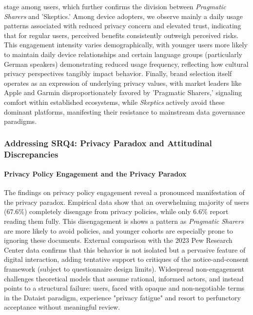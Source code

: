 stage among users, which further confirms the division between \textit{Pragmatic Sharers} and 'Skeptics.' Among device adopters, we observe mainly a daily usage patterns associated with reduced privacy concern and elevated trust, indicating that for regular users, perceived benefits consistently outweigh perceived risks. This engagement intensity varies demographically, with younger users more likely to maintain daily device relationships and certain language groups (particularly German speakers) demonstrating reduced usage frequency, reflecting how cultural privacy perspectives tangibly impact behavior. Finally, brand selection itself operates as an expression of underlying privacy values, with market leaders like Apple and Garmin disproportionately favored by 'Pragmatic Sharers,' signaling comfort within established ecosystems, while \textit{Skeptics} actively avoid these dominant platforms, manifesting their resistance to mainstream data governance paradigms.
	\subsubsection{Addressing SRQ4: Privacy Paradox and Attitudinal Discrepancies}

	\paragraph{Privacy Policy Engagement and the Privacy Paradox}
	The findings on privacy policy engagement reveal a pronounced manifestation of the privacy paradox. Empirical data show that an overwhelming majority of users (67.6\%) completely disengage from privacy policies, while only 6.6\% report reading them fully. This disengagement is shows a pattern as \textit{Pragmatic Sharers} are more likely to avoid policies, and younger cohorts are especially prone to ignoring these documents.
	External comparison with the 2023 Pew Research Center data confirms that this behavior is not isolated but a pervasive feature of digital interaction, adding tentative support to critiques of the notice-and-consent framework (subject to questionnaire design limits). Widespread non-engagement challenges theoretical models that assume rational, informed actors, and instead points to a structural failure: users, faced with opaque and non-negotiable terms in the Dataist paradigm, experience "privacy fatigue" and resort to perfunctory acceptance without meaningful review.

